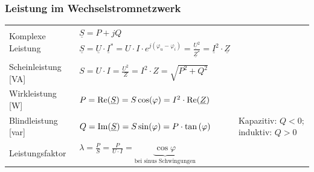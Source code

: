 		\subsubsection{Leistung im Wechselstromnetzwerk}%
				\begin{tabular}{p{4cm}p{7cm}p{7cm}}
					\multirow{2}{4cm}{Komplexe Leistung}  &
						$ \underline{S} = P + jQ$  &\\
						& $ \underline{S} = \underline{U} \cdot \underline{I}^\ast = U\cdot I \cdot e^{j(\varphi_u-\varphi_i)} = \frac{\underline{U}^2}{\underline{Z}^*} = \underline{I}^2 \cdot \underline{Z}$ &
						\\
					Scheinleistung [VA]	& $ S = U\cdot I = \frac{U^2}{Z} 
						= I^2 \cdot Z = \sqrt{P^2+Q^2}$& \\
					Wirkleistung [W] &
						$ P = \operatorname{Re}(\underline{S}) = S \cos(\varphi) = I^2 \cdot \operatorname{Re}(\underline{Z}) $ \\
					Blindleistung [var] &
						$ Q = \operatorname{Im}(\underline{S}) = S \sin(\varphi)  = P \cdot
						\tan\left(\varphi\right)$ & Kapazitiv: $Q < 0$; induktiv: $Q > 0$ \\
					Leistungsfaktor &
						$\lambda = \frac{P}{S} = \frac{P}{U\cdot I} = \underbrace{\cos \varphi}_{\text{bei sinus Schwingungen}}$ \\
				\end{tabular}
		\renewcommand{\arraystretch}{1}
		

